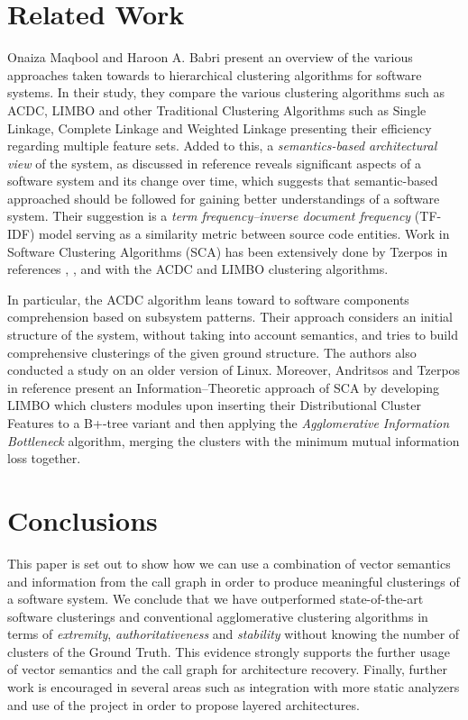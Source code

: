 \documentclass[sigconf,review, anonymous]{acmart}
\begin{document}
\section{Related Work}

Onaiza Maqbool and Haroon A. Babri \cite{maqbool_overview} present an
overview of the various approaches taken towards to hierarchical clustering algorithms
for software systems. In their study, they compare the various clustering algorithms
such as ACDC, LIMBO and other Traditional Clustering Algorithms such as Single
Linkage, Complete Linkage \cite{complete} and Weighted Linkage presenting their efficiency regarding 
multiple feature sets. 
Added to this, a \emph{semantics-based architectural view} of the system, as discussed in reference
\cite{large_study} reveals significant aspects of a software system and its change over 
time, which suggests that semantic-based approached should be followed for gaining better 
understandings of a software system. Their suggestion is a \emph{term frequency--inverse 
document frequency} (TF-IDF) model serving as a similarity metric between source code 
entities. 
Work in Software Clustering Algorithms (SCA) has been extensively done by Tzerpos in
references \cite{mojo}, \cite{stability}, \cite{acdc} and \cite{limbo} with the ACDC
and LIMBO clustering algorithms. 

In particular, the ACDC algorithm leans toward to software components comprehension 
based on subsystem patterns. Their approach considers an initial structure of the system, 
without taking into account semantics, and tries to build comprehensive clusterings of the given ground structure. 
The authors also conducted a study on an older version of  Linux. 
Moreover, Andritsos and Tzerpos in reference \cite{limbo} present an Information--Theoretic 
approach of SCA by developing LIMBO which clusters modules upon inserting their Distributional Cluster Features 
to a B+-tree variant and then applying the \emph{Agglomerative Information Bottleneck} algorithm, merging the 
clusters with the minimum mutual information loss together. 


\section{Conclusions} This paper is set out to show how we can use a combination of vector semantics
and information from the call graph in order to produce meaningful clusterings of a software system.
We conclude that we have outperformed state-of-the-art software clusterings and conventional
agglomerative clustering algorithms 
in terms of \emph{extremity}, \emph{authoritativeness} and \emph{stability} 
without knowing the number of clusters of the Ground Truth. This evidence strongly
supports the further usage of vector semantics and the call graph for architecture recovery.
Finally, further work is encouraged in several areas such as 
integration with more static analyzers and use of the project in order to propose layered architectures.


\newpage


\end{document}
